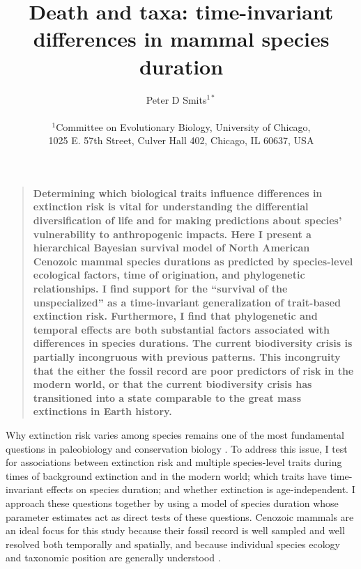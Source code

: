 \documentclass[12pt]{article}
\title{Death and taxa: time-invariant differences in mammal species duration}
\author
{Peter D Smits$^{1\ast}$\\
\\
\normalsize{$^{1}$Committee on Evolutionary Biology, University of Chicago,}\\
\normalsize{1025 E. 57th Street, Culver Hall 402, Chicago, IL 60637, USA}\\
}
\date{}
\newenvironment{sciabstract}{%
\begin{quote} \bf}
{\end{quote}}
\begin{document}
 


\baselineskip24pt


\maketitle 


\begin{sciabstract}
 Determining which biological traits influence differences in extinction risk is vital for understanding the differential diversification of life and for making predictions about species' vulnerability to anthropogenic impacts. Here I present a hierarchical Bayesian survival model of North American Cenozoic mammal species durations as predicted by species-level ecological factors, time of origination, and phylogenetic relationships. I find support for the ``survival of the unspecialized'' as a time-invariant generalization of trait-based extinction risk. Furthermore, I find that phylogenetic and temporal effects are both substantial factors associated with differences in species durations. The current biodiversity crisis is partially incongruous with previous patterns. This incongruity that the either the fossil record are poor predictors of risk in the modern world, or that the current biodiversity crisis has transitioned into a state comparable to the great mass extinctions in Earth history.
\end{sciabstract}

Why extinction risk varies among species remains one of the most fundamental questions in paleobiology and conservation biology \cite{Simpson1944,VanValen1973,Raup1994,Quental2013,Wagner2014b}. To address this issue, I test for associations between extinction risk and multiple species-level traits during times of background extinction and in the modern world; which traits have time-invariant effects on species duration; and whether extinction is age-independent. I approach these questions together by using a model of species duration whose parameter estimates act as direct tests of these questions. Cenozoic mammals are an ideal focus for this study because their fossil record is well sampled and well resolved both temporally and spatially, and because individual species ecology and taxonomic position are generally understood \cite{Alroy2009,Liow2008,Smith2004,Quental2013,Simpson1944,Tomiya2013,Marcot2014}. 
\end{document}

